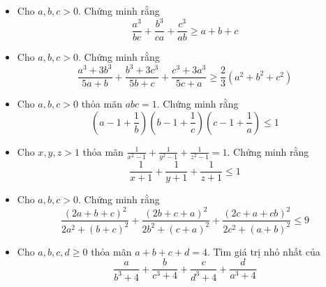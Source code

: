 \documentclass[11pt]{scrartcl}
\begin{document}
\begin{itemize}[label=, leftmargin=0em, itemsep=0.5em]
\begin{btvn}
\[            \]
        \end{btvn}
        \item \begin{btvn}
            Cho $a,b,c >0$. Chứng minh rằng
            \[
                \frac{a^3}{bc} + \frac{b^3}{ca} + \frac{c^3}{ab} \geq a + b  +c
            \]
        \end{btvn}
        \item \begin{btvn}
            Cho $a,b,c >0$. Chứng minh rằng
            \[
                \frac{a^3 + 3b^3}{5a + b} + \frac{b^3 + 3c^3}{5b + c} + \frac{c^3 + 3a^3}{5c + a} \geq \frac{2}{3}(a^2 + b^2 + c^2)
            \]
        \end{btvn}
        \item \begin{btvn}
            Cho $a,b,c >0$ thỏa mãn $abc = 1$. Chứng minh rằng
            \[
                \left(a - 1 + \frac{1}{b}\right)\left(b - 1 + \frac{1}{c}\right)\left(c- 1 + \frac{1}{a}\right) \leq 1
            \]
        \end{btvn}
        \item \begin{btvn}
            Cho $x,y,z > 1$ thỏa mãn $\frac{1}{x^2 - 1} + \frac{1}{y^2 - 1} + \frac{1}{z^2 - 1} = 1$. Chứng minh rằng
            \[
                \frac{1}{x + 1} + \frac{1}{y + 1} + \frac{1}{z + 1} \leq 1
            \]
        \end{btvn}
        \item \begin{btvn}
            Cho $a,b,c >0$. Chứng minh rằng
            \[
                \frac{(2a + b + c)^2}{2a^2 + (b + c)^2} + \frac{(2b + c + a)^2}{2b^2 + (c + a)^2} + \frac{(2c + a + cb)^2}{2c^2 + (a + b)^2} \leq 9
            \]
        \end{btvn}
        \item \begin{btvn}
            Cho $a,b,c,d \geq 0$ thỏa mãn $a + b + c + d = 4$. Tìm giá trị nhỏ nhất của
            \[
                \frac{a}{b^3 + 4} + \frac{b}{c^3 + 4} + \frac{c}{d^3 + 4} + \frac{d}{a^3 + 4}
            \]
        \end{btvn}


\end{itemize}
\end{document}
